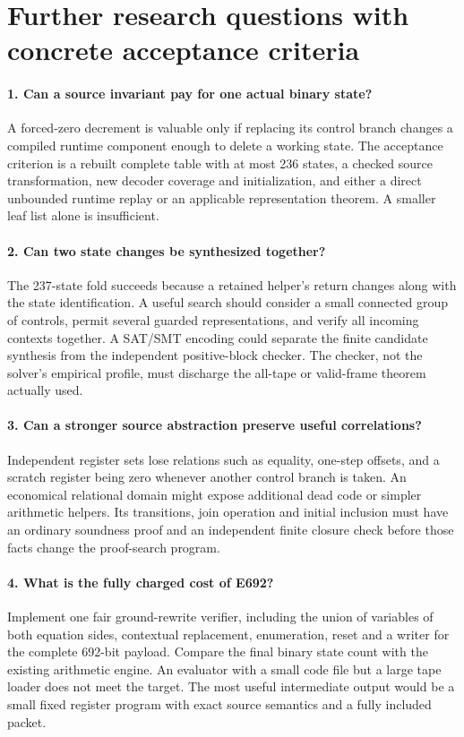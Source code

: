 \section{Further research questions with concrete acceptance criteria}
\label{sec:further}

\paragraph{1. Can a source invariant pay for one actual binary state?}
A forced-zero decrement is valuable only if replacing its control
branch changes a compiled runtime component enough to delete a
working state.  The acceptance criterion is a rebuilt complete
table with at most 236 states, a checked source transformation,
new decoder coverage and initialization, and either a direct
unbounded runtime replay or an applicable representation theorem.
A smaller leaf list alone is insufficient.

\paragraph{2. Can two state changes be synthesized together?}
The 237-state fold succeeds because a retained helper's return
changes along with the state identification.  A useful search
should consider a small connected group of controls, permit
several guarded representations, and verify all incoming
contexts together.  A SAT/SMT encoding could separate the
finite candidate synthesis from the independent positive-block
checker.  The checker, not the solver's empirical profile,
must discharge the all-tape or valid-frame theorem actually used.

\paragraph{3. Can a stronger source abstraction preserve useful correlations?}
Independent register sets lose relations such as equality,
one-step offsets, and a scratch register being zero whenever
another control branch is taken.  An economical relational
domain might expose additional dead code or simpler arithmetic
helpers.  Its transitions, join operation and initial inclusion
must have an ordinary soundness proof and an independent finite
closure check before those facts change the proof-search program.

\paragraph{4. What is the fully charged cost of E692?}
Implement one fair ground-rewrite verifier, including the union
of variables of both equation sides, contextual replacement,
enumeration, reset and a writer for the complete 692-bit payload.  Compare the final
binary state count with the existing arithmetic engine.
An evaluator with a small code file but a large tape loader
does not meet the target.  The most useful intermediate output
would be a small fixed register program with exact source
semantics and a fully included packet.

